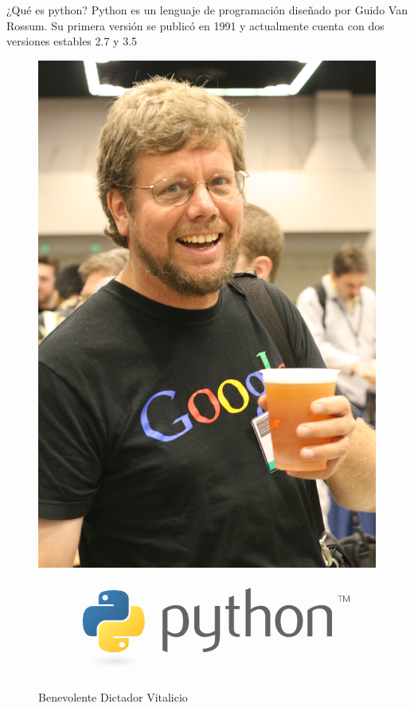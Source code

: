 \documentclass[11pt]{beamer}
\begin{document}
\begin{frame}{¿Qué es python?}
Python es un lenguaje de programación diseñado por Guido Van Rossum. Su primera versión se publicó en 1991 y actualmente cuenta con dos versiones estables 2.7 y 3.5
\begin{figure}
\includegraphics[scale=0.03]{guido.jpg}
\caption{Benevolente Dictador Vitalicio}
\includegraphics[scale=0.2]{python-logo.png}
\end{figure}
\end{frame}
\end{document}
